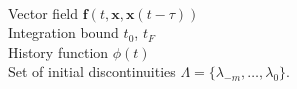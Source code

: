\begin{algorithm}[H]
  \caption{Pseudo code for DDE solver}
  \label{alg:error_est}
\begin{algorithmic}
   \\ Vector field $\mathbf{f}(t,\mathbf{x}, \mathbf{x}(t-\tau))$ \\ Integration bound $t_0$, $t_{F}$ \\ History function $\phi(t)$ \\ Set of initial discontinuities $\Lambda = \{\lambda_{-m}, \dots, \lambda_0 \}$.
  \REPEAT
\end{algorithmic}
\label{al:agl2}
\end{algorithm}